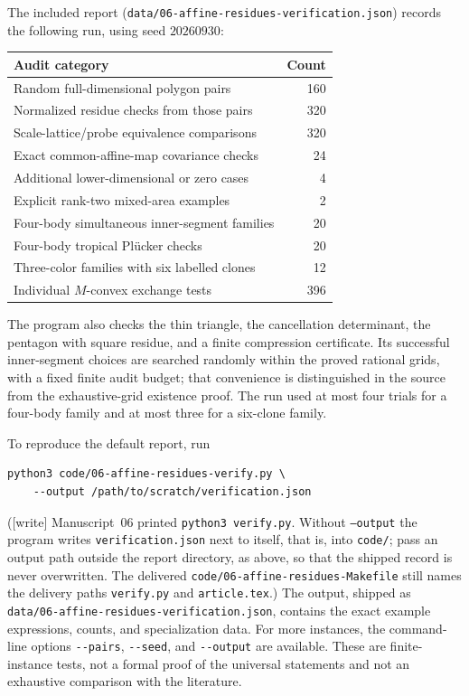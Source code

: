 \documentclass[11pt,a4paper]{article}
\numberwithin{equation}{section}
\theoremstyle{plain}
\newcommand{\wtag}{\textup{[write]}}%
\newcommand{\pathcode}[1]{\nolinkurl{#1}}
\begin{document}
The included report (\pathcode{data/06-affine-residues-verification.json}) records the following run, using seed $20260930$:
\begin{center}
\begin{tabular}{@{}p{}r@{}}
\toprule
Audit category & Count\\
\midrule
Random full-dimensional polygon pairs & 160\\
Normalized residue checks from those pairs & 320\\
Scale-lattice/probe equivalence comparisons & 320\\
Exact common-affine-map covariance checks & 24\\
Additional lower-dimensional or zero cases & 4\\
Explicit rank-two mixed-area examples & 2\\
Four-body simultaneous inner-segment families & 20\\
Four-body tropical Pl\"ucker checks & 20\\
Three-color families with six labelled clones & 12\\
Individual $M$-convex exchange tests & 396\\
\bottomrule
\end{tabular}
\end{center}
The program also checks the thin triangle, the cancellation determinant,
the pentagon with square residue, and a finite compression certificate.
Its successful inner-segment choices are searched randomly within the
proved rational grids, with a fixed finite audit budget; that convenience
is distinguished in the source from the exhaustive-grid existence proof.
The run used at most four trials for a four-body family and at most three
for a six-clone family.

To reproduce the default report, run
\begin{verbatim}
python3 code/06-affine-residues-verify.py \
    --output /path/to/scratch/verification.json
\end{verbatim}
(\wtag{} Manuscript~06 printed \texttt{python3 verify.py}. Without
\texttt{--output} the program writes \texttt{verification.json} next to
itself, that is, into \pathcode{code/}; pass an output path outside the
report directory, as above, so that the shipped record is never
overwritten. The delivered \pathcode{code/06-affine-residues-Makefile} still
names the delivery paths \texttt{verify.py} and \texttt{article.tex}.)
The output, shipped as \pathcode{data/06-affine-residues-verification.json}, contains the exact example
expressions, counts, and specialization data. For more instances, the
command-line options \pathcode{--pairs}, \pathcode{--seed}, and
\pathcode{--output} are available. These are finite-instance tests, not a
formal proof of the universal statements and not an exhaustive comparison
with the literature.
\end{document}
